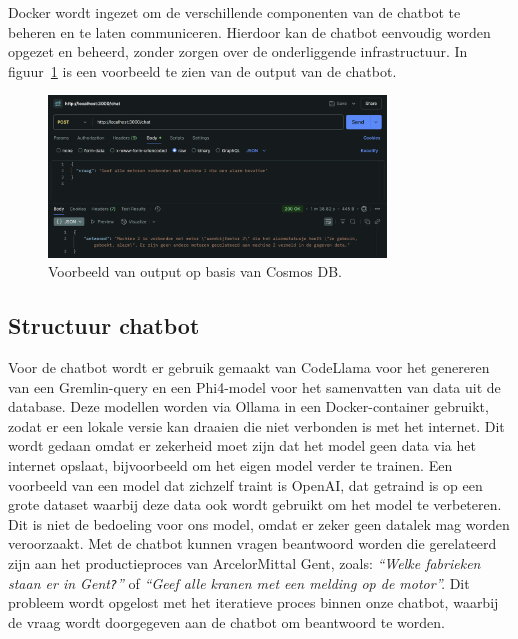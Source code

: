Docker wordt ingezet om de verschillende componenten van de chatbot te beheren en te laten communiceren.
Hierdoor kan de chatbot eenvoudig worden opgezet en beheerd, zonder zorgen over de onderliggende infrastructuur.
In figuur~\ref{fig:output} is een voorbeeld te zien van de output van de chatbot.

\begin{figure}[H]
    \centering
    \includegraphics[width=0.8\textwidth]{./img/response.png}
    \caption[Output chatbot]{\label{fig:output}Voorbeeld van output op basis van Cosmos DB.}
\end{figure}

\subsection{Structuur chatbot}
Voor de chatbot wordt er gebruik gemaakt van CodeLlama voor het genereren van een Gremlin-query en een Phi4-model voor het samenvatten van data uit de database.
Deze modellen worden via Ollama in een Docker-container gebruikt, zodat er een lokale versie kan draaien die niet verbonden is met het internet. Dit wordt gedaan omdat er zekerheid moet zijn dat het model geen data via het internet opslaat, bijvoorbeeld om het eigen model verder te trainen.
Een voorbeeld van een model dat zichzelf traint is OpenAI, dat getraind is op een grote dataset waarbij deze data ook wordt gebruikt om het model te verbeteren.
Dit is niet de bedoeling voor ons model, omdat er zeker geen datalek mag worden veroorzaakt.
Met de chatbot kunnen vragen beantwoord worden die gerelateerd zijn aan het productieproces van ArcelorMittal Gent, zoals: \emph{``Welke fabrieken staan er in Gent\texttt{?}''} of \emph{``Geef alle kranen met een melding op de motor''.}
Dit probleem wordt opgelost met het iteratieve proces binnen onze chatbot, waarbij de vraag wordt doorgegeven aan de chatbot om beantwoord te worden.

